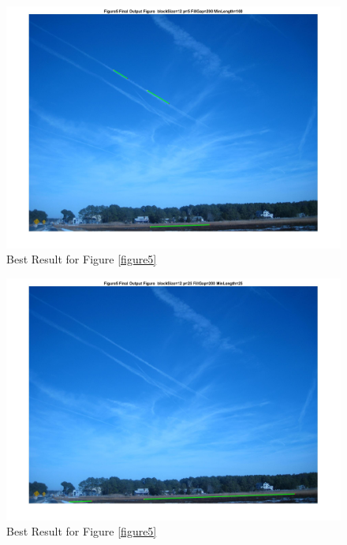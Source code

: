 	\begin{figure}[hbtp]
		\centering
		\includegraphics[width=6in]{pic/Figure5_best.jpg}
		\caption{Best Result for Figure \ref{figure5}}
		\label{Figure5_best}
	\end{figure}


	\begin{figure}[hbtp]
		\centering
		\includegraphics[width=6in]{pic/Figure5_worst.jpg}
		\caption{Best Result for Figure \ref{figure5}}
		\label{Figure5_worst}
	\end{figure}
